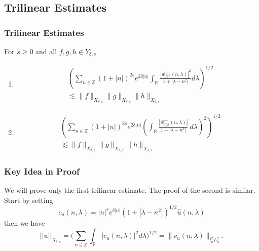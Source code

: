 \documentclass{beamer}
\numberwithin{equation}{section}
\newcommand{\rr}{\mathbb{R}}
\newcommand{\zz}{\mathbb{Z}}
\newcommand{\wh}{\widehat}
\begin{document}
\subsection{Trilinear Estimates}
\begin{frame}
  \frametitle{Trilinear Estimates}
\begin{lemma}\label{bilinear1}
 For $s\ge 0$ and all $f, g, h \in Y_{\delta,s}$
 \begin{enumerate}
   \item
 \begin{align*}
   & \left ( \sum_{n \in {\mathbb{Z}}} (1+|n|)^{2s}e^{2\delta |n|}
\int_{\mathbb{R}}
\frac{|\widehat{w_{fgh}}(n, \lambda)|^2}{1+|\lambda -n^2|}
d\lambda
\right )^{1/2}
\\
& \lesssim \|f\|_{X_{\delta,s}} \|g\|_{X_{\delta,
s}}\|h\|_{X_{\delta,s}} 
\end{align*}
\item
\begin{align*}
& \left( \sum_{n \in \zz} \left (1 + |n| \right )^{2s} e^{2\delta |n|} \left (
\int_\rr \frac{|\wh{w_{fgh}}(n, \lambda) |}{1 + | \lambda - n^{2} |} \ d\lambda
\right)^2  \right)^{1/2}
\\
& \lesssim \|f\|_{X_{\delta,s}} \|g\|_{X_{\delta,
s}}\|h\|_{X_{\delta,s}}
\end{align*}
\end{enumerate}
\end{lemma}
\end{frame}
%
%
\begin{frame}
  \frametitle{Key Idea in Proof}
We will prove only the first trilinear estimate. The proof of the second is
similar. Start by setting
\begin{equation*}
c_u(n,\lambda)=|n|^s e^{\delta |n|}(1+|\lambda-n^2|)^{1/2}\widehat{u}(n,\lambda)
\end{equation*}
then we have
\begin{equation*}
||u||_{{X}_{\delta,s}}=\Big (\sum_{n\in \mathbb{{Z}}}\int_{\mathbb{R}}|c_u(n,\lambda)|^2d\lambda \Big )^{1/2}
=\| c_u(n,\lambda) \|_{l^2_n L^2_{\lambda}}.
\end{equation*}
\end{frame}
\end{document}
